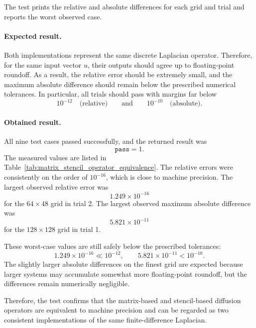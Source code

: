 The test prints the relative and absolute differences for each grid and trial and reports the worst observed case.

\paragraph{Expected result.}
Both implementations represent the same discrete Laplacian operator. Therefore, for the same input vector \(u\), their outputs should agree up to floating-point roundoff. As a result, the relative error should be extremely small, and the maximum absolute difference should remain below the prescribed numerical tolerances. In particular, all trials should pass with margins far below
\[
10^{-12}\quad \text{(relative)}
\qquad\text{and}\qquad
10^{-10}\quad \text{(absolute)}.
\]

\paragraph{Obtained result.}
All nine test cases passed successfully, and the returned result was
\[
\texttt{pass} = 1.
\]
The measured values are listed in Table~\ref{tab:matrix_stencil_operator_equivalence}. The relative errors were consistently on the order of \(10^{-16}\), which is close to machine precision. The largest observed relative error was
\[
1.249\times 10^{-16}
\]
for the \(64\times 48\) grid in trial 2. The largest observed maximum absolute difference was
\[
5.821\times 10^{-11}
\]
for the \(128\times 128\) grid in trial 1.

These worst-case values are still safely below the prescribed tolerances:
\[
1.249\times 10^{-16} \ll 10^{-12},
\qquad
5.821\times 10^{-11} < 10^{-10}.
\]
The slightly larger absolute differences on the finest grid are expected because larger systems may accumulate somewhat more floating-point roundoff, but the differences remain numerically negligible.

Therefore, the test confirms that the matrix-based and stencil-based diffusion operators are equivalent to machine precision and can be regarded as two consistent implementations of the same finite-difference Laplacian.

